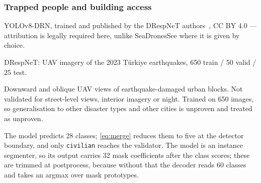 \subsubsection{Trapped people and building access}
\label{sec:building}

\begin{description}[leftmargin=7.4em,labelwidth=7.0em,style=sameline,font=\normalfont\itshape]
  \item[Model] YOLOv8-DRN, trained and published by the DRespNeT
    authors~\citep{sirma2025drespnet}, CC BY 4.0 — attribution is legally
    required here, unlike SeaDronesSee where it is given by choice.
  \item[Dataset] DRespNeT: UAV imagery of the 2023 Türkiye earthquakes,
    650 train / 50 valid / 25 test.
  \item[Envelope] Downward and oblique UAV views of earthquake-damaged urban
    blocks. Not validated for street-level views, interior imagery or night.
    Trained on 650 images, so generalisation to other disaster types and other
    cities is unproven and treated as unproven.
\end{description}

The model predicts 28 classes; \cref{eq:merge} reduces them to five at the
detector boundary, and only \texttt{civilian} reaches the validator. The model
is an instance segmenter, so its output carries 32 mask coefficients after the
class scores; these are trimmed at postprocess, because without that the
decoder reads 60 classes and takes an argmax over mask prototypes.


